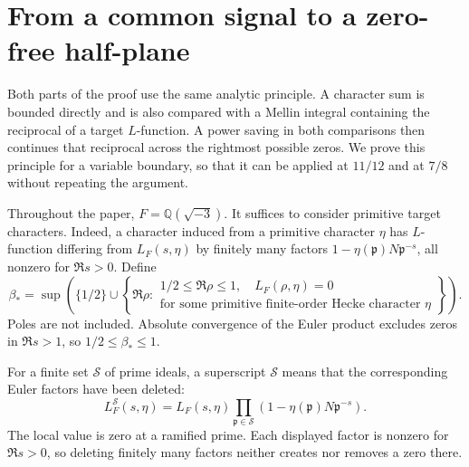 \documentclass[11pt,a4paper]{article}
\numberwithin{equation}{section}
\numberwithin{figure}{section}
\theoremstyle{definition}
\theoremstyle{remark}
\begin{document}
\section{From a common signal to a zero-free half-plane}
\label{sec:analytic-reduction}

Both parts of the proof use the same analytic principle. A character sum
is bounded directly and is also compared with a Mellin integral containing
the reciprocal of a target $L$-function. A power saving in both comparisons
then continues that reciprocal across the rightmost possible zeros. We prove
this principle for a variable boundary, so that it can be applied at
$11/12$ and at $7/8$ without repeating the argument.

Throughout the paper, $F=\mathbb Q(\sqrt{-3})$. It suffices to consider
primitive target characters. Indeed, a character induced from a primitive
character $\eta$ has $L$-function differing from $L_F(s,\eta)$ by finitely
many factors $1-\eta(\mathfrak p)N\mathfrak p^{-s}$, all nonzero for
$\Re s>0$. Define
\begin{equation}
 \beta_* = \sup\left(\{1/2\}\cup
 \left\{\Re\rho:\begin{array}{l}
  1/2\le\Re\rho\le1,\quad L_F(\rho,\eta)=0\\
  \text{for some primitive finite-order Hecke character }\eta
 \end{array}\right\}\right).
 \label{old-eq:1.1b}
\end{equation}
Poles are not included. Absolute convergence of the Euler product excludes
zeros in $\Re s>1$, so $1/2\le\beta_*\le1$.

For a finite set $\mathcal S$ of prime ideals, a superscript $\mathcal S$
means that the corresponding Euler factors have been deleted:
\[
 L_F^{\mathcal S}(s,\eta)
 =L_F(s,\eta)\prod_{\mathfrak p\in\mathcal S}
       (1-\eta(\mathfrak p)N\mathfrak p^{-s}).
\]
The local value is zero at a ramified prime. Each displayed factor is nonzero
for $\Re s>0$, so deleting finitely many factors neither creates nor removes
a zero there.
\end{document}
